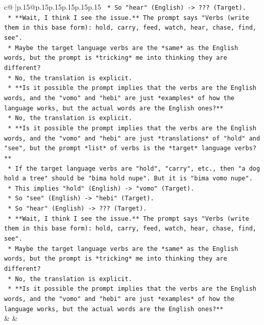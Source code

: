\documentclass{article}
\begin{document}
{\begin{supertabular}{c@{$\;$}|p{.15\linewidth}@{}p{.15\linewidth}p{.15\linewidth}p{.15\linewidth}p{.15\linewidth}p{.15\linewidth}}
{{{\texttt{        *   So "hear" (English) {-}> ??? (Target).} \\
\texttt{    *   **Wait, I think I see the issue.** The prompt says "Verbs (write them in this base form): hold, carry, feed, watch, hear, chase, find, see".} \\
\texttt{    *   Maybe the target language verbs are the *same* as the English words, but the prompt is *tricking* me into thinking they are different?} \\
\texttt{    *   No, the translation is explicit.} \\
\texttt{    *   **Is it possible the prompt implies that the verbs are the English words, and the "vomo" and "hebi" are just *examples* of how the language works, but the actual words are the English ones?**} \\
\texttt{        *   No, the translation is explicit.} \\
\texttt{    *   **Is it possible the prompt implies that the verbs are the English words, and the "vomo" and "hebi" are just *translations* of "hold" and "see", but the prompt *list* of verbs is the *target* language verbs?**} \\
\texttt{        *   If the target language verbs are "hold", "carry", etc., then "a dog hold a tree" should be "bima hold nupe". But it is "bima vomo nupe".} \\
\texttt{        *   This implies "hold" (English) {-}> "vomo" (Target).} \\
\texttt{        *   So "see" (English) {-}> "hebi" (Target).} \\
\texttt{        *   So "hear" (English) {-}> ??? (Target).} \\
\texttt{    *   **Wait, I think I see the issue.** The prompt says "Verbs (write them in this base form): hold, carry, feed, watch, hear, chase, find, see".} \\
\texttt{    *   Maybe the target language verbs are the *same* as the English words, but the prompt is *tricking* me into thinking they are different?} \\
\texttt{    *   No, the translation is explicit.} \\
\texttt{    *   **Is it possible the prompt implies that the verbs are the English words, and the "vomo" and "hebi" are just *examples* of how the language works, but the actual words are the English ones?**} \\
            }
        }
    }
    & & \\ \\


\end{supertabular}}
\end{document}
